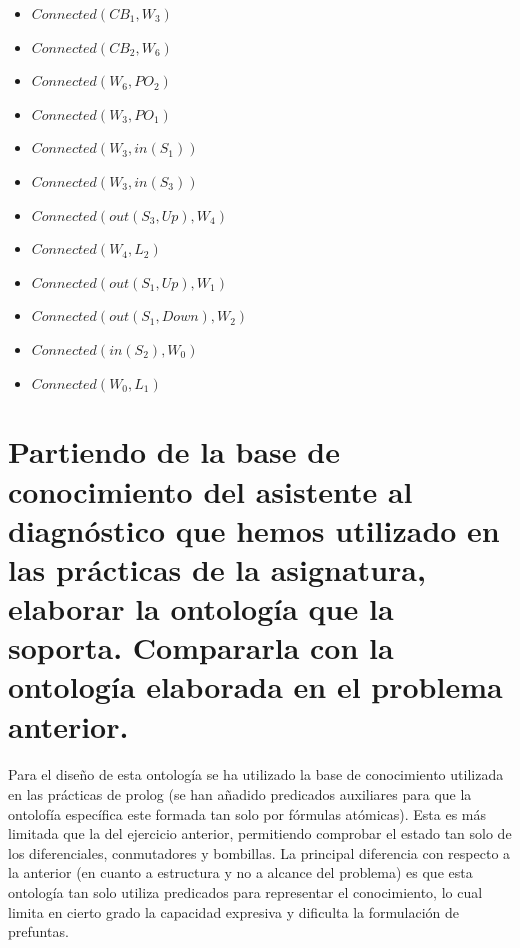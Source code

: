\documentclass[10pt, a4paper,spanish]{article}
\begin{document}
\begin{itemize}
\begin{itemize}
					\item $ Connected(CB_1, W_3)$
					\item $ Connected(CB_2, W_6)$
					\item $ Connected(W_6, PO_2)$
					\item $ Connected(W_3, PO_1)$
					\item $ Connected(W_3, in(S_1))$
					\item $ Connected(W_3, in(S_3))$
					\item $ Connected(out(S_3, Up), W_4)$
					\item $ Connected(W_4, L_2)$
					\item $ Connected(out(S_1, Up), W_1)$
					\item $ Connected(out(S_1, Down), W_2)$
					\item $ Connected(in(S_2), W_0)$
					\item $ Connected(W_0, L_1)$
				\end{itemize}
			\end{itemize}



	\clearpage
	\section{Partiendo de la base de conocimiento del asistente al diagnóstico que hemos utilizado en las prácticas de la asignatura, elaborar la ontología que la soporta. Compararla con la ontología elaborada en el problema anterior.}

		\paragraph{}
		Para el diseño de esta ontología se ha utilizado la base de conocimiento utilizada en las prácticas de prolog (se han añadido predicados auxiliares para que la ontolofía específica este formada tan solo por fórmulas atómicas). Esta es más limitada que la del ejercicio anterior, permitiendo comprobar el estado tan solo de los diferenciales, conmutadores y bombillas. La principal diferencia con respecto a la anterior (en cuanto a estructura y no a alcance del problema) es que esta ontología  tan solo utiliza predicados para representar el conocimiento, lo cual limita en cierto grado la capacidad expresiva y dificulta la formulación de prefuntas.
\end{document}

